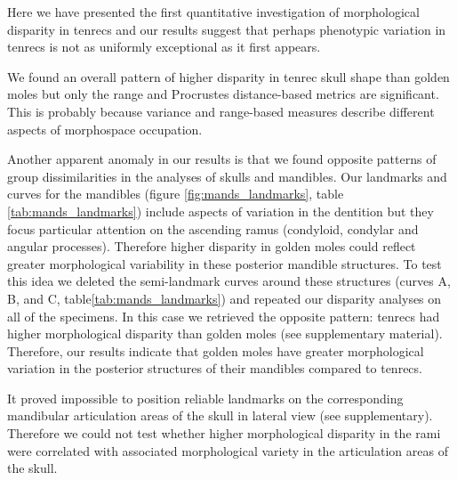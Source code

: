\documentclass[12pt,a4paper]{article}
\begin{document}
	Here we have presented the first quantitative investigation of morphological disparity in tenrecs and our results suggest that perhaps phenotypic variation in tenrecs is not as uniformly exceptional as it first appears.





	We found an overall pattern of higher disparity in tenrec skull shape than golden moles but only the range and Procrustes distance-based metrics are significant. This is probably because variance and range-based measures describe different aspects of morphospace occupation. 




	
	Another apparent anomaly in our results is that we found opposite patterns of group dissimilarities in the analyses of skulls and mandibles. 
	Our landmarks and curves for the mandibles (figure \ref{fig:mands_landmarks}, table \ref{tab:mands_landmarks}) include aspects of variation in the dentition but they focus particular attention on the ascending ramus (condyloid, condylar and angular processes). Therefore higher disparity in golden moles could reflect greater morphological variability in these posterior mandible structures. To test this idea we deleted the semi-landmark curves around these structures (curves A, B, and C, table\ref{tab:mands_landmarks}) and repeated our disparity analyses on all of the specimens. In this case we retrieved the opposite pattern: tenrecs had higher morphological disparity than golden moles (see supplementary material).
	Therefore, our results indicate that golden moles have greater morphological variation in the posterior structures of their mandibles compared to tenrecs.
		
 	It proved impossible to position reliable landmarks on the corresponding mandibular articulation areas of the skull in lateral view (see supplementary). Therefore we could not test whether higher morphological disparity in the rami were correlated with associated morphological variety in the articulation areas of the skull.
	
\end{document}
